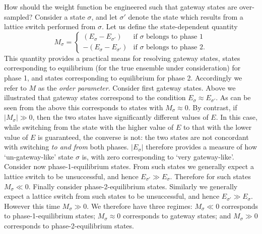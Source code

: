 \documentclass{report}
\begin{document}
How should the weight function be engineered such that gateway states are over-sampled? 
Consider a state $\sigma$, and let $\sigma'$ denote the state which results from a lattice switch performed from $\sigma$. Let us define the 
state-dependent quantity
\begin{equation}\label{M_def}
M_{\sigma}=
\begin{cases}
(E_{\sigma}-E_{\sigma'}) & \text{if $\sigma$ belongs to phase 1} \\
-(E_{\sigma}-E_{\sigma'}) & \text{if $\sigma$ belongs to phase 2}.
\end{cases}
\end{equation}
This quantity provides a practical means for resolving gateway states, states corresponding to equilibrium (for the true ensemble under consideration)
for phase 1, and states corresponding to equilibrium for phase 2. Accordingly we refer to $M$ as the \emph{order parameter}. Consider first gateway states.
Above we illustrated that gateway states correspond to the condition $E_{\sigma}\approx E_{\sigma'}$. As can be seen from the above this corresponds to
states with $M_{\sigma}\approx 0$. By contrast, if $|M_{\sigma}|\gg 0$, then the two states have significantly different values of $E$. In this case, while
switching from the state with the higher value of $E$ to that with the lower value of $E$ is guaranteed, the converse is not: the two states are not 
concordant with switching \emph{to and from} both phases. $|E_{\sigma}|$ therefore provides a measure of how `un-gateway-like' state $\sigma$ is, with 
zero corresponding to `very gateway-like'. 
Consider now phase-1-equilibrium states. From such states we generally expect a lattice switch to be unsuccessful, and hence
$E_{\sigma'}\gg E_{\sigma}$. Therefore for such states $M_{\sigma}\ll 0$. Finally consider phase-2-equilibrium states. Similarly we generally expect 
a lattice switch from such states to be unsuccessful, and hence $E_{\sigma'}\gg E_{\sigma}$. However this time $M_{\sigma}\gg 0$. 
We therefore have three regimes: $M_{\sigma}\ll 0$ corresponds to phase-1-equilibrium states; $M_{\sigma}\approx 0$ corresponds to gateway states; and 
$M_{\sigma}\gg 0$ corresponds to phase-2-equilibrium states.
\end{document}
